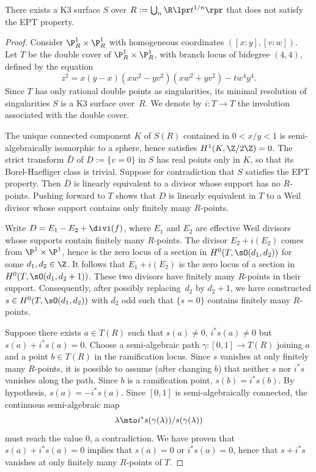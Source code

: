 \begin{prop}
\label{prop:cexEPT}
There exists a K3 surface $S$ over $R:=\bigcup_n\R\lpr t^{1/n}\rpr$ that does not satisfy the EPT property.
\end{prop}

\begin{proof}
Consider $\P^1_R\times \P^1_R$ with homogeneous coordinates $([x:y],[v:w])$.
Let $T$ be the double cover of $\P^1_R\times\P^1_R$, with branch locus of bidegree $(4,4)$, defined by the equation
\[
z^2=x(y-x)(xw^2-yv^2)(xw^2+yv^2)-tw^4y^4.
\]
Since $T$ has only rational double points as singularities, its minimal resolution of singularities $S$ is a K3 surface over~$R$. We denote by $i:T\to T$ the involution associated with the double cover.

The unique connected component $K$ of $S(R)$ contained in $0<x/y<1$ is semi-algebraically isomorphic to a sphere, hence satisfies $H^1(K,\Z/2\Z)=0$. The strict transform $\bar{D}$ of $D:=\{v=0\}$ in $S$ has real points only in $K$, so that its Borel-Haefliger class is trivial. Suppose for contradiction that $S$ satisfies the EPT property. Then $\bar{D}$ is linearly equivalent to a divisor whose support has no $R$-points. Pushing forward to $T$ shows that $D$ is linearly equivalent in $T$ to a Weil divisor whose support contains only finitely many $R$-points.

Write $D=E_1-E_2+\divi(f)$, where $E_1$ and $E_2$ are effective Weil divisors whose supports contain finitely many $R$-points. The divisor $E_2+i(E_2)$ comes from $\P^1\times \P^1$, hence is the zero locus of a section in $H^0(T,\sO(d_1,d_2))$ for some $d_1, d_2\in\Z$. It follows that $E_1+i(E_2)$ is the zero locus of a section in $H^0(T,\sO(d_1,d_2+1))$. These two divisors have finitely many $R$-points in their support. Consequently, after possibly replacing~$d_2$ by $d_2+1$, we have constructed $s\in H^0(T,\sO(d_1,d_2))$ with $d_2$ odd such that $\{s=0\}$ contains finitely many $R$-points.

Suppose there exists $a\in T(R)$ such that $s(a)\neq 0$, $i^*s(a)\neq 0$ but $s(a)+i^*s(a)=0$. Choose a semi-algebraic path $\gamma:[0,1]\to T(R)$ joining $a$ and a point $b\in T(R)$ in the ramification locus. Since $s$ vanishes at only finitely many $R$-points, it is possible to assume (after changing $b$) that neither $s$ nor $i^*s$ vanishes along the path. Since $b$ is a ramification point, $s(b)=i^*s(b)$. By hypothesis, $s(a)=-i^*s(a)$.
Since $[0,1]$ is semi-algebraically connected,
the continuous semi-algebraic map
\[
\lambda\mto i^*s(\gamma(\lambda))/s(\gamma(\lambda))
\]
must reach the value $0$, a contradiction. We have proven that $s(a)+i^*s(a)=0$ implies that $s(a)=0$ or $i^*s(a)=0$, hence that $s+i^*s$ vanishes at only finitely many $R$-points of $T$.


\end{proof}
